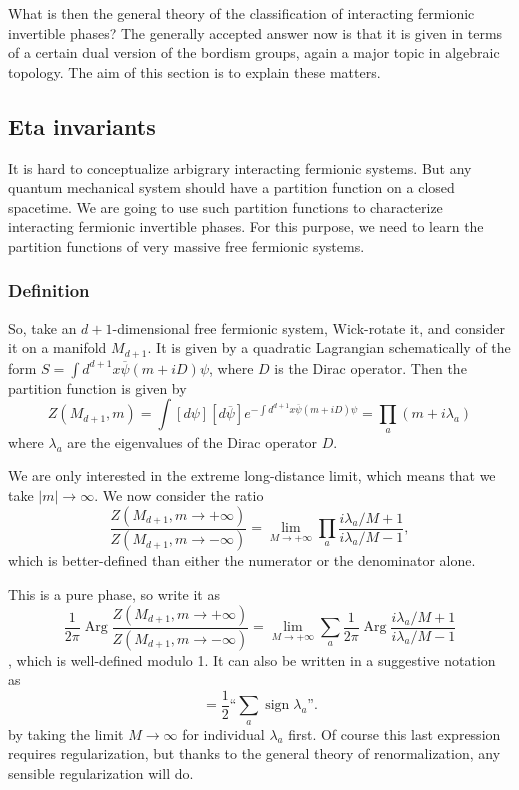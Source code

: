 \documentclass[12pt]{article}
\numberwithin{equation}{section}
\numberwithin{figure}{section}
\theoremstyle{remark}
\let\bar\overline
\def\Arg{\mathop{\mathrm{Arg}}}
\def\sign{\mathop{\mathrm{sign}}}
\begin{document}
What is then the general theory of the classification of interacting fermionic invertible phases?
The generally accepted answer now is that it is given in terms of 
a certain dual version of the bordism groups, again a major topic 
in algebraic topology.
The aim of this section is to explain these matters.

\subsection{Eta invariants}
It is hard to conceptualize arbigrary interacting fermionic systems.
But any quantum mechanical system should have a partition function on a closed spacetime.
We are going to use such partition functions to characterize interacting fermionic invertible phases.
For this purpose, we need to learn the partition functions of very massive free fermionic systems.

\subsubsection{Definition}
So, take an $d+1$-dimensional free fermionic system, Wick-rotate it,
and consider it on a manifold $M_{d+1}$.
It is given by a quadratic Lagrangian schematically of the form 
$S=\int d^{d+1}x \bar\psi (m+iD)\psi$,
where $D$ is the Dirac operator. Then the partition function is given by \begin{equation}
Z(M_{d+1},m) = \int [d\psi][d\bar\psi] e^{-\int d^{d+1}x \bar\psi (m+iD)\psi}
= \prod_{a} (m+i \lambda_a)
\end{equation}
where $\lambda_a$ are the eigenvalues of the Dirac operator $D$.

We are only interested in the extreme long-distance limit, which means that we take $|m|\to\infty$.
We now consider the ratio \begin{equation}
\frac{Z(M_{d+1},m\to +\infty)}{Z(M_{d+1},m\to -\infty)} =
\lim_{M\to +\infty}\prod_a \frac{i\lambda_a/M+1}{i\lambda_a/M-1},
\end{equation}
which is better-defined than either the numerator or the denominator alone.

This is a pure phase, so write it as \begin{equation}
  \frac{1}{2\pi}\Arg \frac{Z(M_{d+1},m\to +\infty)}{Z(M_{d+1},m\to -\infty)} = \lim_{M\to +\infty}\sum_a \frac1{2\pi}\Arg \frac{i\lambda_a/M+1}{i\lambda_a/M-1} 
\end{equation},
which is well-defined modulo 1.
It can also be written in a suggestive notation as \begin{equation}
  =\frac12 \text{``}\sum_a \sign \lambda_a \text{''}.
\end{equation}
by taking the limit $M\to \infty$ for individual $\lambda_a$ first.
Of course this last expression requires regularization, 
but thanks to the general theory of renormalization, any sensible regularization will do.
\end{document}
